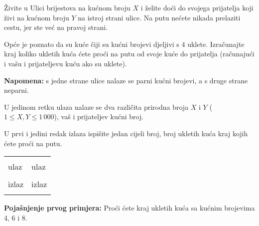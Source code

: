 \renewcommand{\taskname}{UŽAS}
\renewcommand{\timelimit}{1 sekunda}
\renewcommand{\memorylimit}{32 MB}
\renewcommand{\score}{30 bodova}

Živite u Ulici brijestova na kućnom broju $X$ i želite doći do svojega prijatelja koji živi na kućnom broju $Y$ na istroj strani ulice. Na putu nećete nikada prelaziti cestu, jer ste već na pravoj strani.

Opće je poznato da su kuće čiji su kućni brojevi djeljivi s 4 uklete. Izračunajte kraj koliko ukletih kuća ćete proći na putu od svoje kuće do prijatelja (računajući i vašu i prijateljevu kuću ako su uklete). 

\textbf{Napomena:} s jedne strane ulice nalaze se parni kućni brojevi, a s druge strane neparni.

\strut


U jedinom retku ulaza nalaze se dva različita prirodna broja $X$ i $Y$ ($1 \leqslant X, Y \leqslant 1\,000$), vaš i prijateljev kućni broj.


U prvi i jedini redak izlaza ispišite jedan cijeli broj, broj ukletih kuća kraj kojih ćete proći na putu.

\strut


\begin{center}
\fontfamily{\ttdefault}
\fontsize{10pt}{1em}
\selectfont
\begin{tabu}to 0.99\textwidth{|X[1]|X[1]|}
\hline
& \\ 
\rowfont{\fontsize{10pt}{1em}\bfseries}
ulaz & ulaz \\
 & 
 \\
\rowfont{\fontsize{10pt}{1em}\bfseries}
izlaz & izlaz \\
 & 
 \\
\hline
\end{tabu}
\end{center}

{
\fontsize{10pt}{1em}
\selectfont
\textbf{Pojašnjenje prvog primjera:} Proći ćete kraj ukletih kuća sa kućnim brojevima 4, 6 i 8. \\
}